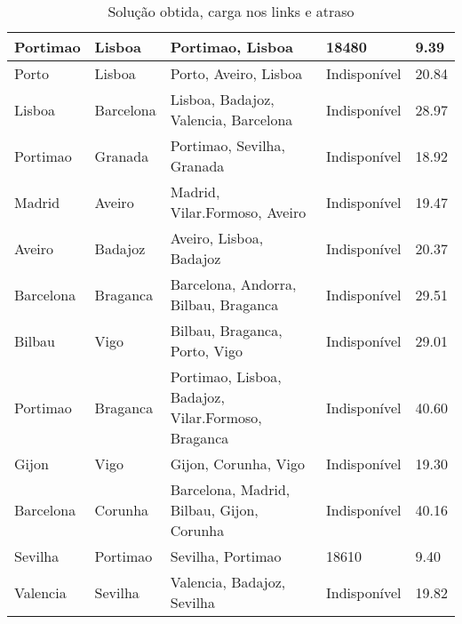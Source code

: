 \begin{table}[!htb]
{\begin{tabular}{|l|l|l|l|l|}
Portimao & Lisboa & Portimao, Lisboa & 18480 & 9.39 \\ \hline
Porto & Lisboa & Porto, Aveiro, Lisboa & Indisponível & 20.84 \\ \hline
Lisboa & Barcelona & Lisboa, Badajoz, Valencia, Barcelona & Indisponível & 28.97 \\ \hline
Portimao & Granada & Portimao, Sevilha, Granada & Indisponível & 18.92 \\ \hline
Madrid & Aveiro & Madrid, Vilar.Formoso, Aveiro & Indisponível & 19.47 \\ \hline
Aveiro & Badajoz & Aveiro, Lisboa, Badajoz & Indisponível & 20.37 \\ \hline
Barcelona & Braganca & Barcelona, Andorra, Bilbau, Braganca & Indisponível & 29.51 \\ \hline
Bilbau & Vigo & Bilbau, Braganca, Porto, Vigo & Indisponível & 29.01 \\ \hline
Portimao & Braganca & Portimao, Lisboa, Badajoz, Vilar.Formoso, Braganca & Indisponível & 40.60 \\ \hline
Gijon & Vigo & Gijon, Corunha, Vigo & Indisponível & 19.30 \\ \hline
Barcelona & Corunha & Barcelona, Madrid, Bilbau, Gijon, Corunha & Indisponível & 40.16 \\ \hline
Sevilha & Portimao & Sevilha, Portimao & 18610 & 9.40 \\ \hline
Valencia & Sevilha & Valencia, Badajoz, Sevilha & Indisponível & 19.82 \\ \hline
\end{tabular}}
\caption[]{Solução obtida, carga nos links e atraso}
\end{table}

